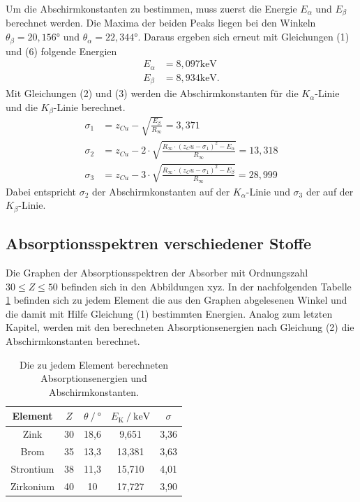 \noindent Um die Abschirmkonstanten zu bestimmen, muss zuerst die Energie $E_\alpha$ und $E_\beta$ berechnet werden. 
Die Maxima der beiden Peaks liegen bei den Winkeln $\theta_{\beta} = 20,156 $° und $\theta_{\alpha} = 22,344$°.
Daraus ergeben sich erneut mit Gleichungen (1) und (6) folgende Energien
\begin{align*}
E_\alpha &= 8,097 \si{\keV} \\
E_\beta &= 8,934 \si{\keV}.
\end{align*}
Mit Gleichungen (2) und (3) werden die Abschirmkonstanten für die $K_{\alpha}$-Linie und die $K_{\beta}$-Linie berechnet.
\begin{align*}
\sigma_1 &= z_{Cu} - \sqrt{\frac{E_\beta}{R_\infty}} = 3,371\\
\sigma_2 &= z_{Cu} - 2 \cdot \sqrt{\frac{R_\infty \cdot (z_Cu - \sigma_1)^2 - E_\alpha}{R_\infty}} = 13,318 \\
\sigma_3 &= z_{Cu} - 3 \cdot \sqrt{\frac{R_\infty \cdot (z_Cu - \sigma_1)^2 - E_\beta}{R_\infty}} = 28,999
\end{align*}
Dabei entspricht $\sigma_2$ der Abschirmkonstanten auf der $K_{\alpha}$-Linie und $\sigma_3$ der auf der $K_{\beta}$-Linie.

\subsection{Absorptionsspektren verschiedener Stoffe}
Die Graphen der Absorptionsspektren der Absorber 
mit Ordnungszahl $30 \leq Z \leq 50$ befinden sich in den Abbildungen xyz.
In der nachfolgenden Tabelle \ref{tab:energie2} befinden sich zu jedem Element die aus den Graphen abgelesenen Winkel
und die damit mit Hilfe Gleichung (1) bestimmten Energien.
Analog zum letzten Kapitel, werden mit den berechneten Absorptionsenergien nach Gleichung (2) die Abschirmkonstanten berechnet.

\begin{table}[H]
  \centering
  \caption{Die zu jedem Element berechneten Absorptionsenergien und Abschirmkonstanten.}
  \label{tab:energie2}
\begin{tabular}{c c c c c}
  \toprule
Element & $Z$ & $\theta \:/\: °$ & $E_\text{K}\:/\: \si{\kilo\electronvolt}$ & $\sigma$\\
\midrule
Zink & 30 & 18,6 & 9,651 & 3,36\\
Brom & 35 & 13,3 & 13,381  & 3,63\\
Strontium & 38 & 11,3 & 15,710 & 4,01\\
Zirkonium & 40 & 10 & 17,727 & 3,90\\
\bottomrule
\end{tabular}
\end{table}

